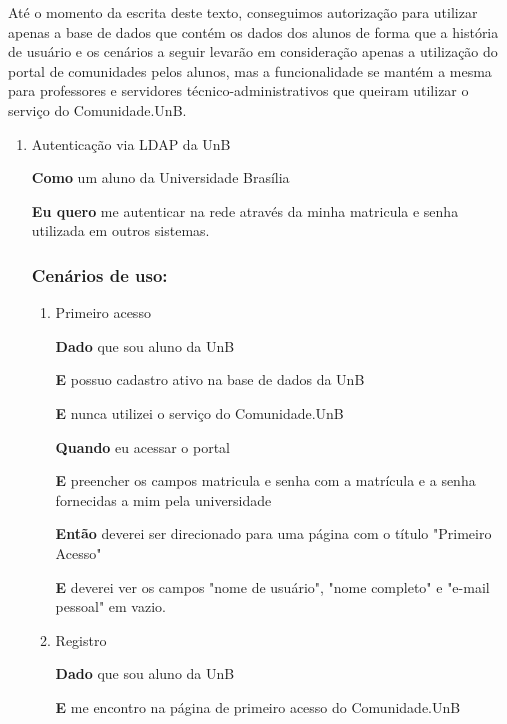 Até o momento da escrita deste texto, conseguimos autorização para utilizar
apenas a base de dados que contém os dados dos alunos de forma que a
história de usuário e os cenários a seguir levarão em consideração apenas
a utilização do portal de comunidades pelos alunos, mas a funcionalidade
se mantém a mesma para professores e servidores técnico-administrativos que
queiram utilizar o serviço do Comunidade.UnB.

\begin{enumerate}

\item Autenticação via LDAP da UnB

\textbf{Como} um aluno da Universidade Brasília

\textbf{Eu quero} me autenticar na rede através da minha matricula e senha
utilizada em outros sistemas.

\subsubsection*{Cenários de uso:}

\begin{enumerate}

\item Primeiro acesso

\textbf{Dado} que sou aluno da UnB

\textbf{E} possuo cadastro ativo na base de dados da UnB

\textbf{E} nunca utilizei o serviço do Comunidade.UnB

\textbf{Quando} eu acessar o portal

\textbf{E} preencher os campos matricula e senha com a matrícula e a senha
fornecidas a mim pela universidade

\textbf{Então} deverei ser direcionado para uma página com o título
"Primeiro Acesso"

\textbf{E} deverei ver os campos "nome de usuário", "nome completo" e
"e-mail pessoal" em vazio.

\item Registro

\textbf{Dado} que sou aluno da UnB

\textbf{E} me encontro na página de primeiro acesso do Comunidade.UnB


\end{enumerate}
\end{enumerate}
